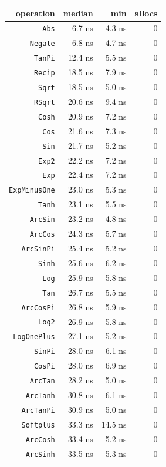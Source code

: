 \begin{table}[h]
\centering
\begin{tabulary}{\linewidth}{R R R R}
\toprule
operation & median & min & allocs \\
\toprule
\texttt{Abs} & 6.7 ns & 4.3 ns & 0 \\
\texttt{Negate} & 6.8 ns & 4.7 ns & 0 \\
\texttt{TanPi} & 12.4 ns & 5.5 ns & 0 \\
\texttt{Recip} & 18.5 ns & 7.9 ns & 0 \\
\texttt{Sqrt} & 18.5 ns & 5.0 ns & 0 \\
\texttt{RSqrt} & 20.6 ns & 9.4 ns & 0 \\
\texttt{Cosh} & 20.9 ns & 7.2 ns & 0 \\
\texttt{Cos} & 21.6 ns & 7.3 ns & 0 \\
\texttt{Sin} & 21.7 ns & 5.2 ns & 0 \\
\texttt{Exp2} & 22.2 ns & 7.2 ns & 0 \\
\texttt{Exp} & 22.4 ns & 7.2 ns & 0 \\
\texttt{ExpMinusOne} & 23.0 ns & 5.3 ns & 0 \\
\texttt{Tanh} & 23.1 ns & 5.5 ns & 0 \\
\texttt{ArcSin} & 23.2 ns & 4.8 ns & 0 \\
\texttt{ArcCos} & 24.3 ns & 5.7 ns & 0 \\
\texttt{ArcSinPi} & 25.4 ns & 5.2 ns & 0 \\
\texttt{Sinh} & 25.6 ns & 6.2 ns & 0 \\
\texttt{Log} & 25.9 ns & 5.8 ns & 0 \\
\texttt{Tan} & 26.7 ns & 5.5 ns & 0 \\
\texttt{ArcCosPi} & 26.8 ns & 5.9 ns & 0 \\
\texttt{Log2} & 26.9 ns & 5.8 ns & 0 \\
\texttt{LogOnePlus} & 27.1 ns & 5.2 ns & 0 \\
\texttt{SinPi} & 28.0 ns & 6.1 ns & 0 \\
\texttt{CosPi} & 28.0 ns & 6.9 ns & 0 \\
\texttt{ArcTan} & 28.2 ns & 5.0 ns & 0 \\
\texttt{ArcTanh} & 30.8 ns & 6.1 ns & 0 \\
\texttt{ArcTanPi} & 30.9 ns & 5.0 ns & 0 \\
\texttt{Softplus} & 33.3 ns & 14.5 ns & 0 \\
\texttt{ArcCosh} & 33.4 ns & 5.2 ns & 0 \\
\texttt{ArcSinh} & 33.5 ns & 5.3 ns & 0 \\
\bottomrule
\end{tabulary}

\end{table}



